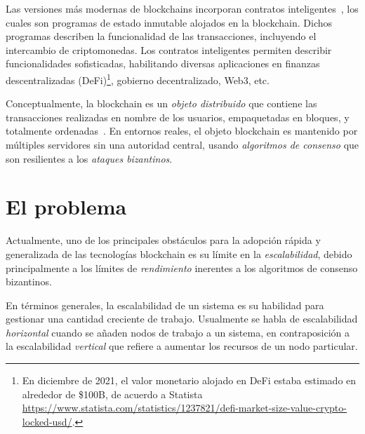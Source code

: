 Las versiones más modernas de blockchains incorporan contratos inteligentes~\cite{szabo96smart,ethereum},
los cuales son programas de estado inmutable alojados en la blockchain. Dichos
programas describen la funcionalidad de las transacciones, incluyendo el intercambio
de criptomonedas.
%
Los contratos inteligentes permiten describir funcionalidades sofisticadas, habilitando
diversas aplicaciones en finanzas descentralizadas (DeFi)\footnote{En diciembre de 2021,
el valor monetario alojado en DeFi estaba estimado en alrededor de \$100B, de acuerdo a Statista
\url{https://www.statista.com/statistics/1237821/defi-market-size-value-crypto-locked-usd/}.},
gobierno decentralizado, Web3, etc.
%

Conceptualmente, la blockchain es un \textit{objeto distribuido}
que contiene las transacciones realizadas
en nombre de los usuarios, empaquetadas en bloques, y totalmente
ordenadas~\cite{anta2018formalizing,anta2021principles}.
%
En entornos reales, el objeto blockchain es mantenido por múltiples servidores
sin una autoridad central, usando \emph{algoritmos de consenso} que son resilientes a los
\emph{ataques bizantinos}.
%



\section{El problema}

Actualmente, uno de los principales obstáculos para la adopción rápida y generalizada
de las tecnologías blockchain es su límite en la \emph{escalabilidad}, debido principalmente a los límites
de \emph{rendimiento} inerentes a los algoritmos de consenso bizantinos.~\cite{Tyagi@BlockchainScalabilitySol,Croman2016ScalingDecentralizedBlockchain}

En términos generales, la escalabilidad de un sistema es su habilidad para gestionar una
cantidad creciente de trabajo.
%
Usualmente se habla de escalabilidad \emph{horizontal} cuando se añaden nodos de trabajo a un sistema,
en contraposición a la escalabilidad \emph{vertical} que refiere a aumentar los recursos de un nodo particular.

